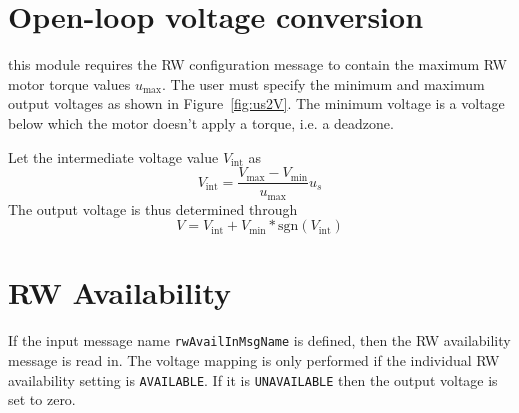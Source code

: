 \documentclass[]{BasiliskReportMemo}
\begin{document}
\section{Open-loop voltage conversion}
this module requires the RW configuration message to contain the maximum RW motor torque values $u_{\text{max}}$.  The user must specify the minimum and maximum output voltages as shown in Figure~\ref{fig:us2V}.  The minimum voltage is a voltage below which the motor doesn't apply a torque, i.e. a deadzone.  

Let the intermediate voltage value $V_{\text{int}}$ as
\begin{equation}
	\label{eq:rwMV:1}
	V_{\text{int}} = \frac{V_{\text{max}} - V_{\text{min}}}{u_{\text{max}}} u_{s}
\end{equation}
The output voltage is thus determined through
\begin{equation}
	V = V_{\text{int}} + V_{\text{min}} *\text{sgn}(V_{\text{int}} )
\end{equation}

\section{RW Availability} 
If the input message name {\tt rwAvailInMsgName} is defined, then the RW availability message is read in. The voltage mapping is only performed if the individual RW availability setting is {\tt AVAILABLE}.  If it is {\tt UNAVAILABLE} then the output voltage is set to zero.  
\end{document}
